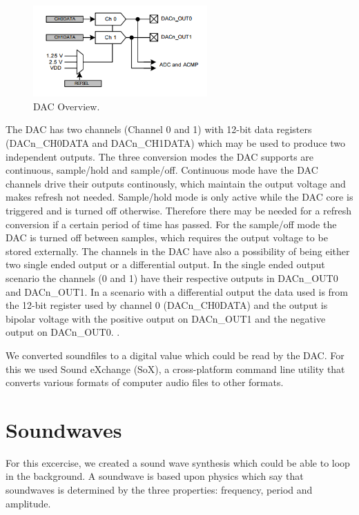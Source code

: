 \begin{figure}[hb]
  \centering
  \includegraphics[height=3.5cm]{images/DAC_view}
  \caption[DAC Overview]
   {DAC Overview. \cite{EFM32GGManual}}
\end{figure}

The DAC has two channels (Channel 0 and 1) with 12-bit data registers
(DACn\_CH0DATA and DACn\_CH1DATA) which may be used to produce two independent
outputs. The three conversion modes the DAC supports are continuous, sample/hold
and sample/off. Continuous mode have the DAC channels drive their outputs
continously, which maintain the output voltage and makes refresh not needed.
Sample/hold mode is only active while the DAC core is triggered and is turned
off otherwise. Therefore there may be needed for a refresh conversion if a
certain period of time has passed. For the sample/off mode the DAC is turned off between
samples, which requires the output voltage to be stored externally. The channels in the DAC have also a possibility
of being either two single ended output or a differential output. In the single
ended output scenario the channels (0 and 1) have their respective outputs in
DACn\_OUT0 and DACn\_OUT1. In a scenario with a differential output the data
used is from the 12-bit register used by channel 0 (DACn\_CH0DATA) and the
output is bipolar voltage with the positive output on DACn\_OUT1 and the
negative output on DACn\_OUT0. \cite{EFM32GGManual}.

We converted soundfiles to a digital value which could be read by the DAC. For
this we used Sound eXchange (SoX), a cross-platform command line utility that
converts various formats of computer audio files to other formats. \cite{SoX}

\section{Soundwaves}

For this excercise, we created a sound wave synthesis which could be able to
loop in the background. A soundwave is based upon physics which
say that soundwaves is determined by the three properties: frequency,
period and amplitude. \cite{TDT4528Compendium}

